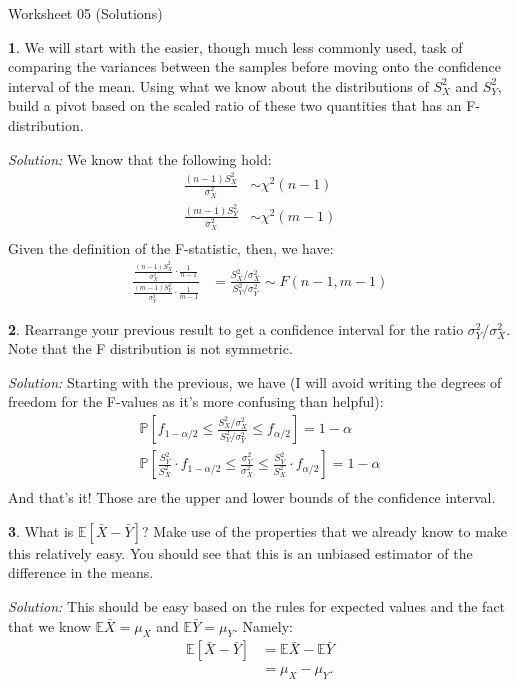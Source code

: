 \documentclass{tufte-handout}
\begin{document}
\justify

{\LARGE Worksheet 05 (Solutions)}

\vspace*{18pt}


\textbf{1}. We will start with the easier, though much less commonly used, task of
comparing the variances between the samples before moving onto the confidence
interval of the mean. Using what we know about the distributions of $S_X^2$ and
$S_Y^2$, build a pivot based on the scaled ratio of these two quantities that
has an F-distribution.

\textit{Solution:} We know that the following hold:
\begin{align*}
\frac{(n-1) S_X^2}{\sigma_X^2} &\sim \chi^2(n-1) \\
\frac{(m-1) S_Y^2}{\sigma_X^2} &\sim \chi^2(m-1) \\
\end{align*}
Given the definition of the F-statistic, then, we have:
\begin{align*}
\frac{
  \frac{(n-1) S_X^2}{\sigma_X^2} \cdot \frac{1}{n-1}
}{
  \frac{(m-1) S_Y^2}{\sigma_Y^2} \cdot \frac{1}{m-1}  
} &= \frac{
  S_X^2 / \sigma_X^2
}{
  S_Y^2 / \sigma_Y^2
} \sim F(n-1, m-1)
\end{align*}

\textbf{2}. Rearrange your previous result to get a confidence interval for the ratio
$\sigma_Y^2 / \sigma_X^2$. Note that the F distribution is not symmetric.

\textit{Solution:} Starting with the previous, we have (I will avoid writing the degrees of
freedom for the F-values as it's more confusing than helpful):
\begin{align*}
\mathbb{P}\left[ f_{1-\alpha/2} \leq \frac{
  S_X^2 / \sigma_X^2
}{
  S_Y^2 / \sigma_Y^2
} \leq f_{\alpha/2} \right] = 1 - \alpha \\
\mathbb{P}\left[
  \frac{S_Y^2}{S_X^2} \cdot f_{1-\alpha/2} \leq 
\frac{\sigma_Y^2}{\sigma_X^2} \leq
\frac{S_Y^2}{S_X^2} \cdot f_{\alpha/2} \right] = 1- \alpha \\
\end{align*}
And that's it! Those are the upper and lower bounds of the confidence interval.

\textbf{3}. What is $\mathbb{E}[\bar{X} - \bar{Y}]$? Make use of the properties that we
already know to make this relatively easy. You should see that this is an
unbiased estimator of the difference in the means.

\textit{Solution:} This should be easy based on the rules for expected values and the 
fact that we know $\mathbb{E}\bar{X} = \mu_X$ and $\mathbb{E}\bar{Y} = \mu_Y$.
Namely:
\begin{align*}
\mathbb{E}[\bar{X} - \bar{Y}] &= \mathbb{E}\bar{X} - \mathbb{E}\bar{Y} \\
&= \mu_X - \mu_Y.
\end{align*}
\end{document}
